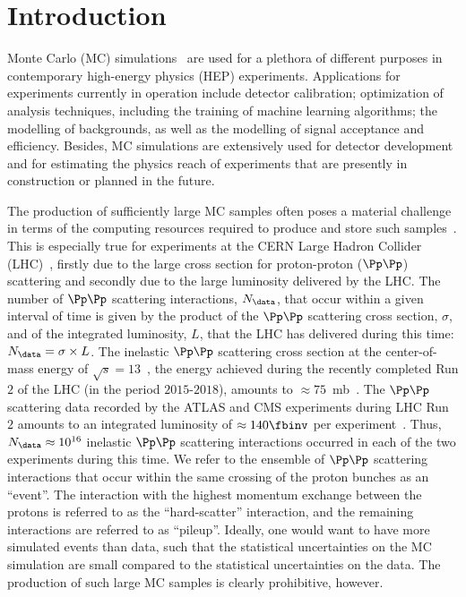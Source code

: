 \section{Introduction}
\label{sec:introduction}

Monte Carlo (MC) simulations~\cite{Kroese2014WhyTM,dunn2011exploring} are used for a plethora of different purposes in contemporary high-energy physics (HEP) experiments.
Applications for experiments currently in operation include detector calibration; optimization of analysis techniques, including the training of machine learning algorithms;
the modelling of backgrounds, as well as the modelling of signal acceptance and efficiency.
Besides, MC simulations are extensively used for detector development and for estimating the physics reach of experiments that are presently in construction or planned in the future.

The production of sufficiently large MC samples often poses a material challenge 
in terms of the computing resources required to produce and store such samples~\cite{HSFPhysicsEventGeneratorWG:2020gxw}.
This is especially true for experiments at the CERN Large Hadron Collider (LHC)~\cite{Bruning:2004ej,Buning:2004wk,Benedikt:2004wm},
firstly due to the large cross section for proton-proton ($\Pp\Pp$) scattering and secondly due to the large luminosity delivered by the LHC.
The number of $\Pp\Pp$ scattering interactions, $N_{\data}$, that occur within a given interval of time 
is given by the product of the $\Pp\Pp$ scattering cross section, $\sigma$, and of the integrated luminosity, $L$, that the LHC has delivered during this time:
$N_{\data} = \sigma \times L$.
The inelastic $\Pp\Pp$ scattering cross section at the center-of-mass energy of $\sqrt{s}=13$~\TeV, the energy achieved during the recently completed Run $2$ of the LHC (in the period $2015$-$2018$),
amounts to $\approx 75$~mb~\cite{Aaboud:2016mmw,Sirunyan:2018nqx}.
The $\Pp\Pp$ scattering data recorded by the ATLAS and CMS experiments during LHC Run $2$ 
amounts to an integrated luminosity of $\approx 140\fbinv$ per experiment~\cite{ATLAS-CONF-2019-021,LUM-17-001,LUM-17-004,LUM-18-002}.
Thus, $N_{\data} \approx 10^{16}$ inelastic $\Pp\Pp$ scattering interactions occurred in each of the two experiments during this time.
We refer to the ensemble of $\Pp\Pp$ scattering interactions that occur within the same crossing of the proton bunches as an ``event''.
The interaction with the highest momentum exchange between the protons is referred to as the ``hard-scatter'' interaction,
and the remaining interactions are referred to as ``pileup''.
Ideally, one would want to have more simulated events than data,
such that the statistical uncertainties on the MC simulation are small compared to the statistical uncertainties on the data.
The production of such large MC samples is clearly prohibitive, however.

